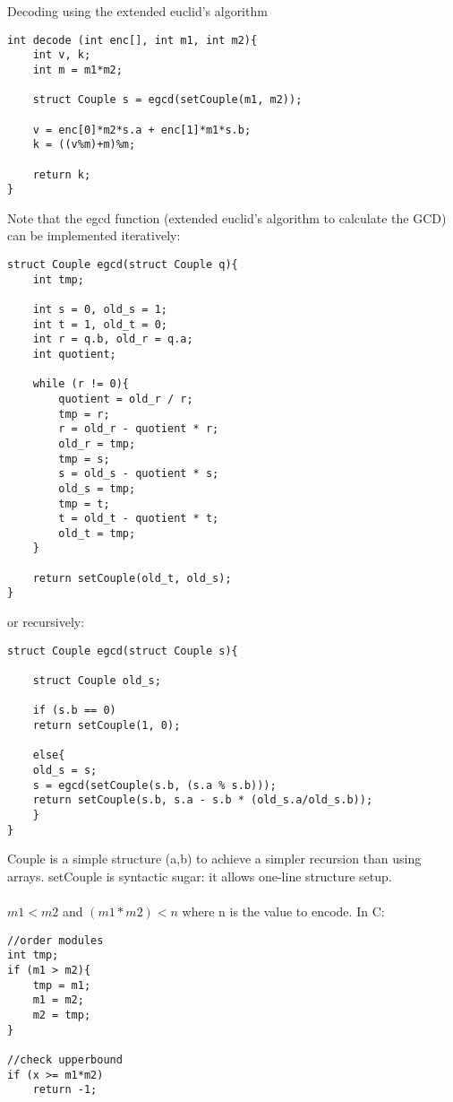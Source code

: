 Decoding using the extended euclid's algorithm
\begin{lstlisting}
int decode (int enc[], int m1, int m2){
	int v, k;
	int m = m1*m2;

	struct Couple s = egcd(setCouple(m1, m2));

	v = enc[0]*m2*s.a + enc[1]*m1*s.b;
	k = ((v%m)+m)%m;

	return k;
}
\end{lstlisting}

Note that the egcd function (extended euclid's algorithm to calculate the GCD) can be implemented iteratively:

\begin{lstlisting}
struct Couple egcd(struct Couple q){
	int tmp;

	int s = 0, old_s = 1;
	int t = 1, old_t = 0;
	int r = q.b, old_r = q.a;
	int quotient;

	while (r != 0){
		quotient = old_r / r;
		tmp = r;		
		r = old_r - quotient * r;
		old_r = tmp;
		tmp = s;
		s = old_s - quotient * s;
		old_s = tmp;
		tmp = t;
		t = old_t - quotient * t;
		old_t = tmp;
	}

	return setCouple(old_t, old_s);
}

\end{lstlisting}
\clearpage
or recursively:
\begin{lstlisting}
struct Couple egcd(struct Couple s){
	
	struct Couple old_s;	
	
	if (s.b == 0)
	return setCouple(1, 0);
	
	else{
	old_s = s;
	s = egcd(setCouple(s.b, (s.a % s.b)));
	return setCouple(s.b, s.a - s.b * (old_s.a/old_s.b));
	}
}
\end{lstlisting}

Couple is a simple structure (a,b) to achieve a simpler recursion than using arrays. setCouple is syntactic sugar: it allows one-line structure setup.  \\\\

$m1 < m2$ and $(m1*m2) < n$ where n is the value to encode. In C:
\begin{lstlisting}
//order modules
int tmp;
if (m1 > m2){
	tmp = m1;
	m1 = m2;
	m2 = tmp;
}

//check upperbound
if (x >= m1*m2)
	return -1;
\end{lstlisting}


